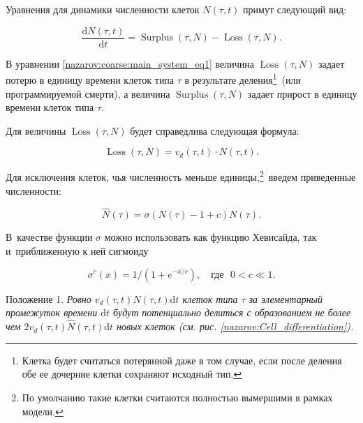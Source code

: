\noindent Уравнения для динамики численности клеток $N(\tau,t)$ примут следующий вид:

%

\begin{equation} \label{nazarov:coarse:main_system_eq1}

	\dfrac{\mathrm{d}N(\tau,t)}{\mathrm{d}t} = 

		\operatorname{Surplus}(\tau,N) - \operatorname{Loss}(\tau,N).

\end{equation}

%



В уравнении \eqref{nazarov:coarse:main_system_eq1} величина $\operatorname{Loss}(\tau,N)$ задает потерю в единицу времени клеток типа $\tau$ в результате деления\footnote{Клетка будет считаться потерянной даже в том случае, если после деления обе ее дочерние клетки сохраняют исходный тип.}\!\!~(или программируемой смерти), а вели\-чина $\operatorname{Surplus}(\tau,N)$ задает прирост в единицу времени клеток типа $\tau$.

Для величины $\operatorname{Loss}(\tau,N)$ будет справедлива следующая формула:

%

\begin{equation} 


\label{nazarov:coarse:delta_eq13}

	\operatorname{Loss}(\tau,N) = v_d(\tau,t) \cdot N(\tau,t).

\end{equation}

%

Для исключения клеток, чья численность меньше единицы,\footnote{По умолчанию такие клетки считаются полностью вымершими в рамках  модели.}\!\!~введем приведенные численности: 

$$\hat{N}({\tau}) = \sigma\left(N(\tau) - 1 + c \right)  N(\tau) .$$ 

В~качестве функции $\sigma$ можно использовать как функцию Хевисайда, так и~приближенную к ней сигмоиду 

$$\sigma^{c}(x) = 1/(1+e^{-x/c}),\quad \text{где~~} 0<c\ll 1.$$

%



\smallskip



{\small\sc Положение 1.} \textit{Ровно $v_d(\tau,t)  \hat{N}(\tau,t) \mathrm{d}t$ клеток типа	$\tau$ за элементарный промежуток времени $\mathrm{d}t$  будут потенциально делиться с образованием не более чем $2  v_d(\tau,t)  \hat{N}(\tau,t)  \mathrm{d}t$ новых клеток {\rm(}см. рис. \rm \ref{nazarov:Cell_differentiation}). }

